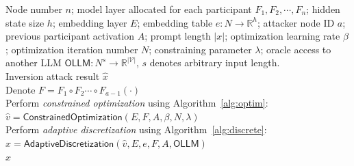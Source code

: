 \begin{algorithm}[!h]
   \caption{\emph{Prompt Inversion Attack for Collaborative Inference}}
   \label{alg:core}
\begin{algorithmic}
    Node number $n$; model layer allocated for each participant $F_1,F_2,\cdots,F_n$; hidden state size $h$; embedding layer $E$; embedding table $e:N\to \mathbb{R}^h$; attacker node ID $a$; previous participant activation $A$; prompt length $|x|$; optimization learning rate $\beta$; optimization iteration number $N$;   constraining parameter $\lambda$; oracle access to another LLM $\mathsf{OLLM}: N^s\to \mathbb{R}^{|\mathcal{V}|}$, $s$ denotes arbitrary input length. 
   \\
    Inversion attack  result $\hat{x}$ \\
    \STATE Denote $F=F_1 \circ F_2 \cdots \circ F_{a-1}(\cdot)$\\
    \STATE Perform \textit{constrained optimization} using Algorithm~\ref{alg:optim}:\\
    \STATE $\hat{v}=\mathsf{ConstrainedOptimization}(E,F,A,\beta,N,\lambda)$\\
    \STATE Perform \textit{adaptive discretization} using Algorithm~\ref{alg:discrete}:\\
    \STATE $\hat{x}=\mathsf{AdaptiveDiscretization}(\hat{v},E,e,F,A,\mathsf{OLLM})$\\
    \RETURN $\hat{x}$\\
\end{algorithmic}
\end{algorithm}

